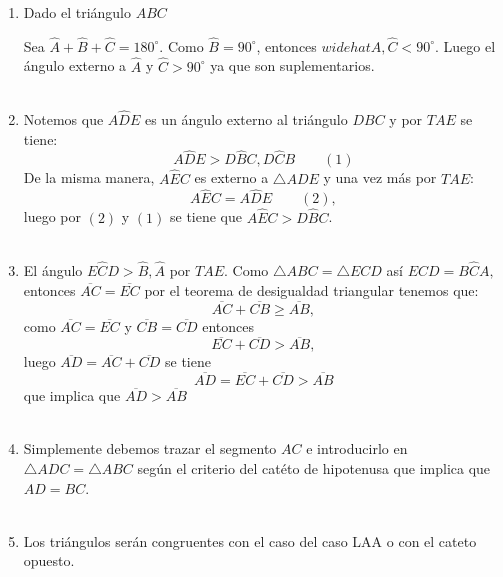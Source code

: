 \begin{enumerate}[\bfseries 1.]
\item Dado el triángulo $ABC$ 
\begin{center}
\end{center}
Sea $\widehat{A}+\widehat{B}+\widehat{C} = 180^{\circ}$. Como $\widehat{B} = 90^{\circ}$, entonces $widehat{A},\widehat{C} < 90^{\circ}$. Luego el ángulo externo a $\widehat{A}$ y $\widehat{C} > 90^{\circ}$ ya que son suplementarios.\\\\

\item Notemos que $A\widehat{D}E$ es un ángulo externo al triángulo $DBC$ y por $TAE$ se tiene: $$A\widehat{D}E > D\widehat{B}C, D\widehat{C}B \qquad (1)$$ De la misma manera, $A\widehat{E}C$ es externo a $\triangle ADE$ y una vez más por $TAE$:
$$A\widehat{E}C = A\widehat{D}E \qquad (2),$$ luego por $(2)$ y $(1)$ se tiene que $A\widehat{E}C > D\widehat{B}C$.\\\\ 

\item El ángulo $E\widehat{C}D > \widehat{B}, \widehat{A}$ por $TAE$. Como $\triangle ABC = \triangle ECD$ así $E\widehat{C}D=B\widehat{C}A,$ entonces $\overline{AC} = \overline{EC}$ por el teorema de desigualdad triangular tenemos que: $$\overline{AC} + \overline{CB} \geq \overline{AB},$$ como $\overline{AC} = \overline{EC}$ y $\overline{CB} = \overline{CD}$ entonces $$\overline{EC} + \overline{CD} > \overline{AB},$$ luego $\overline{AD} = \overline{AC} + \overline{CD}$ se tiene $$\overline{AD} = \overline{EC} + \overline{CD} > \overline{AB}$$ que implica que $\overline{AD} > \overline{AB}$\\\\

\item Simplemente debemos trazar el segmento $AC$ e introducirlo en  $\triangle ADC = \triangle ABC$ según el criterio del catéto de hipotenusa que implica que $AD = BC$.\\\\

\item Los triángulos serán congruentes con el caso del caso LAA o con el cateto opuesto.\\\\


\end{enumerate}
